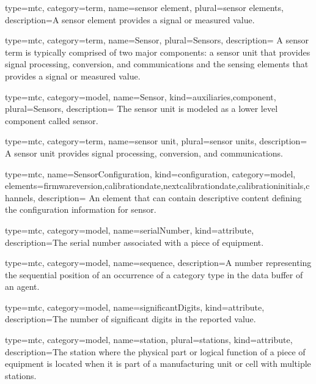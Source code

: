 {
  type=mtc,
  category=term,
  name={sensor element},
  plural={sensor elements},
  description={A \gls{sensor element} provides a signal or measured value.}
}


{
  type=mtc,
  category=term,
  name={Sensor},
  plural={Sensors},
  description= {A \gls{sensor term} is typically comprised of two major components: a \gls{sensor unit} that provides signal processing, conversion, and communications and the \glspl{sensing element} that provides a signal or measured value.}
}


{
  type=mtc,
  category=model,
  name={Sensor},
  kind={auxiliaries,component},
  plural={Sensors},
  description= {The \gls{sensor unit} is modeled as a \gls{lower level} \gls{component} called \gls{sensor}.}
}


{
  type=mtc,
  category=term,
  name={sensor unit},
  plural={sensor units},
  description= {A \gls{sensor unit} provides signal processing, conversion, and communications.}
}


{
  type=mtc,
  name={SensorConfiguration},
  kind={configuration},
  category=model,
  elements={\gls{firmwareversion},\gls{calibrationdate},\gls{nextcalibrationdate},\gls{calibrationinitials},\gls{channels}},
  description= {An element that can contain descriptive content defining the configuration information for \gls{sensor}.}
}


{
  type=mtc,
  category=model,
  name={serialNumber},
  kind={attribute},
  description={The serial number associated with a piece of equipment. }
}


{
  type=mtc,
  category=model,
  name={sequence},
  description={A number representing the sequential position of an occurrence of a \gls{category} type in the data buffer of an \gls{agent}. }
}


{
  type=mtc,
  category=model,
  name={significantDigits},
  kind={attribute},
  description={The number of significant digits in the reported value.}
}


{
  type=mtc,
  category=model,
  name={station},
  plural={stations},
  kind={attribute},
  description={The station where the physical part or logical function of a piece of equipment is located when it is part of a manufacturing unit or cell with multiple stations.}
}


